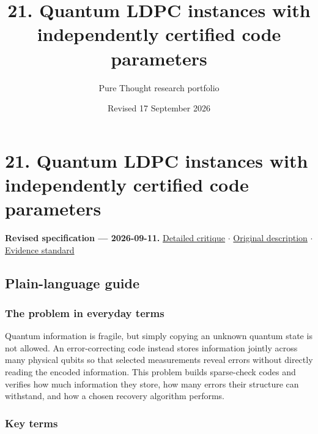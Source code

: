 \documentclass[
  11pt,
]{article}
\title{21. Quantum LDPC instances with independently certified code
parameters}
\author{Pure Thought research portfolio}
\date{Revised 17 September 2026}
\begin{document}
\maketitle
\thispagestyle{empty}
\clearpage

\section{21. Quantum LDPC instances with independently certified code
parameters}

\textbf{Revised specification --- 2026-09-11.}
\href{https://github.com/rick-stevens-ai/Pure-Thought/blob/main/reviews/21-Quantum-LDPC-Codes.md}{Detailed
critique} \ensuremath{\cdot}
\href{https://github.com/rick-stevens-ai/Pure-Thought/blob/main/archive/original-PRDs/21-Quantum-LDPC-Codes.md}{Original
description} \ensuremath{\cdot}
\href{https://github.com/rick-stevens-ai/Pure-Thought/blob/main/reviews/EVIDENCE-STANDARD.md}{Evidence
standard}

\subsection{Plain-language guide}

\subsubsection{The problem in everyday terms}

Quantum information is fragile, but simply copying an unknown quantum
state is not allowed. An error-correcting code instead stores
information jointly across many physical qubits so that selected
measurements reveal errors without directly reading the encoded
information. This problem builds sparse-check codes and verifies how
much information they store, how many errors their structure can
withstand, and how a chosen recovery algorithm performs.

\subsubsection{Key terms}
\end{document}
